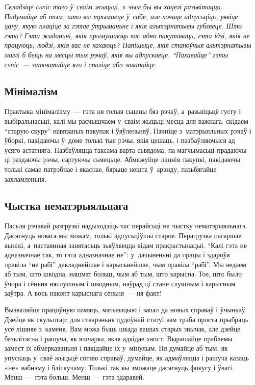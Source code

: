 \emph{Складзіце сьпіс таго ў~сваім жыцьці, з~чым бы вы хацелі разьвітацца. Падумайце аб тым, што вы трымаеце ў~сабе, але хочаце адпусьціць, уявіце цану, якую плаціце за гэтае ўтрыманьне і якія альтэрнатывы губляеце. Што гэта? Гэта жаданьні, якія прымушаюць вас адно пакутаваць, гэта ідэі, якія не працуюць, людзі, якія вас не кахаюць? Напішыце, якія станоўчыя альтэрнатывы маглі б быць на месцы тых рэчаў, якія вы адпускаеце. ``Пахавайце'' гэты сьпіс~--- запячатайце яго і спаліце або закапайце.}

\subsection*{Мінімалізм}

Практыка мінімалізму~--- гэта ня голыя сьцены бяз рэчаў, а~разьвіцьцё густу і выбіральнасьці, калі мы расчышчаем у~сваім жыцьці месца для важнага, скідаем ``старую скуру'' навязаных пакупак і ўяўленьняў. Пачніце з~матэрыяльных рэчаў і ўборкі, пакідаючы ў~доме толькі тыя рэчы, якія цешаць, і пазбаўляючыся ад усяго астатняга. Пазбаўляцца таксама варта сьвядома, па магчымасьці прадаючы ці раздаючы рэчы, сартуючы сьмецьце. Абмяжуйце лішнія пакупкі, пакідаючы толькі самае патрэбнае і якаснае, бярыце нешта ў~арэнду, пазьбягайце захламленьня.

\subsection*{Чыстка нематэрыяльнага}

Пасьля рэчавай разгрузкі надыходзіць час перайсьці на чыстку нематэрыяльнага. Дасягнуць новага мы можам, толькі адпусьціўшы старое. Перагрузка пагаршае вынікі, а~пастаянная занятасьць зьяўляецца відам пракрастынацыі. ``Калі гэта не адназначнае так, то гэта адназначнае не'': у~дачыненьні да працы і здароўя правіла ``не рабі'' дакладнейшае і карысьнейшае, чым правіла ``рабі''. Мы ведаем аб тым, што шкодна, нашмат больш, чым аб тым, што карысна. Тое, што было ўчора і сёньня няслушным і шкодным, наўрад ці стане слушным і карысным заўтра. А вось наконт карыснага сёньня~--- ня факт!

Вызваляйце працоўную памяць, матывацыю і запал да новых справаў і ўчынкаў. Дзейце як скульптар: для стварэньня цудоўнай статуі вам трэба проста прыбраць усё лішняе з~каменя. Вам можа быць шкада вашых старых звычак, але дзейце бязьлітасна і рашуча, як яшчарка, якая адкідае хвост. Вырашайце праблемы замест іх абмеркаваньня і пакідайце іх у~мінулым. Ня думайце аб тым, як упускаць у~сваё жыцьцё сотню справаў, думайце, як адмаўляцца і рашуча казаць «не» вабнаму і бліскучаму. Толькі так вы зможаце дасягнуць фокусу і ўвагі. Менш~--- гэта больш. Менш~--- гэта здаравей.

